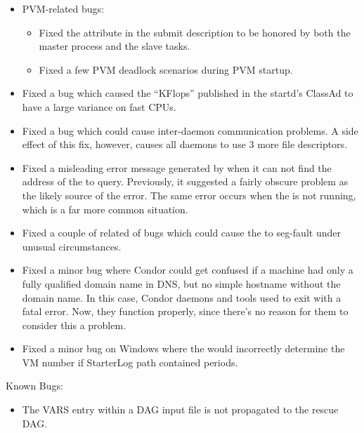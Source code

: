 \begin{itemize}
\item PVM-related bugs:
  \begin{itemize}
    \item Fixed the  attribute in the submit description 
		to be honored by both the master process and the slave tasks.
    \item Fixed a few PVM deadlock scenarios during PVM startup.
  \end{itemize}

\item Fixed a bug which caused the ``KFlops'' published in the
startd's ClassAd to have a large variance on fast CPUs.

\item Fixed a bug which could cause inter-daemon communication
problems.  A side effect of this fix, however, causes all daemons to
use 3 more file descriptors.

\item Fixed a misleading error message generated by  when it
  can not find the address of the  to query.
  Previously, it suggested a fairly obscure problem as the likely
  source of the error.
  The same error occurs when the  is not running, which
  is a far more common situation.

\item Fixed a couple of related of bugs which could cause the
  to seg-fault under unusual circumstances.

\item Fixed a minor bug where Condor could get confused if a machine
  had only a fully qualified domain name in DNS, but no simple
  hostname without the domain name.
  In this case, Condor daemons and tools used to exit with a fatal
  error.
  Now, they function properly, since there's no reason for them to
  consider this a problem.

 \item Fixed a minor bug on Windows where the  would
   incorrectly determine the VM number if StarterLog path contained
   periods.

\end{itemize}

\noindent Known Bugs:

\begin{itemize}

\item The VARS entry within a DAG input file is not propagated
to the rescue DAG.

\end{itemize}



